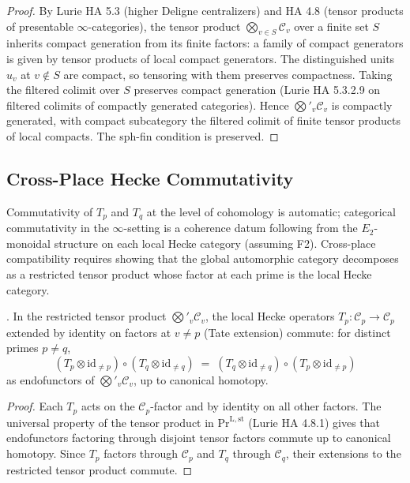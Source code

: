 \begin{proof}
By Lurie HA 5.3 (higher Deligne centralizers) and HA 4.8 (tensor
products of presentable \(\infty\)-categories), the tensor product
\(\bigotimes_{v\in S}\mathcal{C}_{v}\) over a finite set \(S\) inherits
compact generation from its finite factors: a family of compact
generators is given by tensor products of local compact generators.
The distinguished units \(u_{v}\) at \(v\notin S\) are compact, so
tensoring with them preserves compactness. Taking the filtered
colimit over \(S\) preserves compact generation (Lurie HA 5.3.2.9 on
filtered colimits of compactly generated categories). Hence
\(\bigotimes'_{v}\mathcal{C}_{v}\) is compactly generated, with
compact subcategory the filtered colimit of finite tensor products
of local compacts. The sph-fin condition is preserved.
\end{proof}

\subsection{Cross-Place Hecke Commutativity}
\label{v4-arith:acd:obstruction-4}

Commutativity of \(T_{p}\) and \(T_{q}\) at the level of cohomology is
automatic; categorical commutativity in the \(\infty\)-setting is a
coherence datum following from the \(E_{2}\)-monoidal structure on
each local Hecke category (assuming F2). Cross-place compatibility
requires showing that the global automorphic category decomposes as a
restricted tensor product whose factor at each prime is the local Hecke
category.

\begin{proposition}
\label{v4-arith:acd:prop:cross-place-commutativity}
\ClaimStatusProvedHere. In the restricted tensor product
\(\bigotimes'_{v}\mathcal{C}_{v}\), the local Hecke operators
\(T_{p}:\mathcal{C}_{p}\to\mathcal{C}_{p}\) extended by identity on
factors at \(v\neq p\) (Tate extension) commute: for distinct primes
\(p\neq q\),
\begin{equation}
(T_{p}\otimes\mathrm{id}_{\neq p})\circ(T_{q}\otimes\mathrm{id}_{\neq q})\;=\;(T_{q}\otimes\mathrm{id}_{\neq q})\circ(T_{p}\otimes\mathrm{id}_{\neq p})
\end{equation}
as endofunctors of \(\bigotimes'_{v}\mathcal{C}_{v}\), up to canonical
homotopy.
\end{proposition}

\begin{proof}
Each \(T_{p}\) acts on the \(\mathcal{C}_{p}\)-factor and by identity on
all other factors. The universal property of the tensor product in
\(\mathrm{Pr}^{\mathrm{L,st}}\) (Lurie HA 4.8.1) gives that
endofunctors factoring through disjoint tensor factors commute up
to canonical homotopy. Since \(T_{p}\) factors through \(\mathcal{C}_{p}\)
and \(T_{q}\) through \(\mathcal{C}_{q}\), their extensions to the
restricted tensor product commute.
\end{proof}


